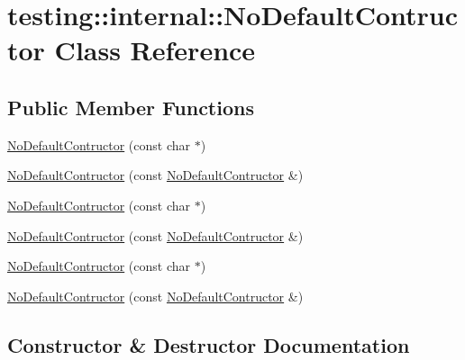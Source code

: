 \hypertarget{classtesting_1_1internal_1_1_no_default_contructor}{}\section{testing\+::internal\+::No\+Default\+Contructor Class Reference}
\label{classtesting_1_1internal_1_1_no_default_contructor}
\subsection*{Public Member Functions}
\begin{DoxyCompactItemize}
\item 
\mbox{\hyperlink{classtesting_1_1internal_1_1_no_default_contructor_a34c9cdf833476a9718141dcff931ba42}{No\+Default\+Contructor}} (const char $\ast$)
\item 
\mbox{\hyperlink{classtesting_1_1internal_1_1_no_default_contructor_acba74b55a8c5341808ecb5b9318eaecf}{No\+Default\+Contructor}} (const \mbox{\hyperlink{classtesting_1_1internal_1_1_no_default_contructor}{No\+Default\+Contructor}} \&)
\item 
\mbox{\hyperlink{classtesting_1_1internal_1_1_no_default_contructor_a34c9cdf833476a9718141dcff931ba42}{No\+Default\+Contructor}} (const char $\ast$)
\item 
\mbox{\hyperlink{classtesting_1_1internal_1_1_no_default_contructor_acba74b55a8c5341808ecb5b9318eaecf}{No\+Default\+Contructor}} (const \mbox{\hyperlink{classtesting_1_1internal_1_1_no_default_contructor}{No\+Default\+Contructor}} \&)
\item 
\mbox{\hyperlink{classtesting_1_1internal_1_1_no_default_contructor_a34c9cdf833476a9718141dcff931ba42}{No\+Default\+Contructor}} (const char $\ast$)
\item 
\mbox{\hyperlink{classtesting_1_1internal_1_1_no_default_contructor_acba74b55a8c5341808ecb5b9318eaecf}{No\+Default\+Contructor}} (const \mbox{\hyperlink{classtesting_1_1internal_1_1_no_default_contructor}{No\+Default\+Contructor}} \&)
\end{DoxyCompactItemize}


\subsection{Constructor \& Destructor Documentation}
\mbox{\label{classtesting_1_1internal_1_1_no_default_contructor_a34c9cdf833476a9718141dcff931ba42}} 
